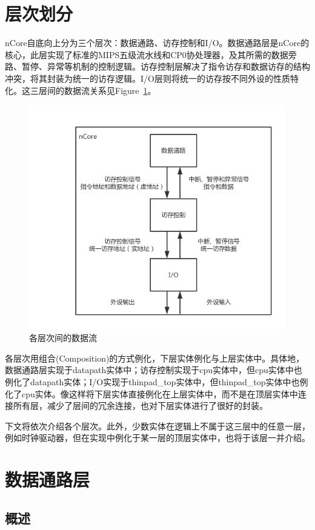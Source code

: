 \documentclass{article}
\begin{document}
\begin{spacing}{1.4}
\section{层次划分}

nCore自底向上分为三个层次：数据通路、访存控制和I/O。数据通路层是nCore的核心，此层实现了标准的MIPS五级流水线和CP0协处理器，及其所需的数据旁路、暂停、异常等机制的控制逻辑。访存控制层解决了指令访存和数据访存的结构冲突，将其封装为统一的访存逻辑。I/O层则将统一的访存按不同外设的性质特化。这三层间的数据流关系见Figure~\ref{fig:layer-data-flow}。

\begin{figure}[!htb]
	\centering
	\includegraphics[width=.7\textwidth]{layer-data-flow.png}
	\caption{各层次间的数据流}
    \label{fig:layer-data-flow}
\end{figure}

各层次用组合(Composition)的方式例化，下层实体例化与上层实体中。具体地，数据通路层实现于datapath实体中；访存控制实现于cpu实体中，但cpu实体中也例化了datapath实体；I/O实现于thinpad\_top实体中，但thinpad\_top实体中也例化了cpu实体。像这样将下层实体直接例化在上层实体中，而不是在顶层实体中连接所有层，减少了层间的冗余连接，也对下层实体进行了很好的封装。

下文将依次介绍各个层次。此外，少数实体在逻辑上不属于这三层中的任意一层，例如时钟驱动器，但在实现中例化于某一层的顶层实体中，也将于该层一并介绍。

\section{数据通路层}

\subsection{概述}


\end{spacing}
\end{document}
